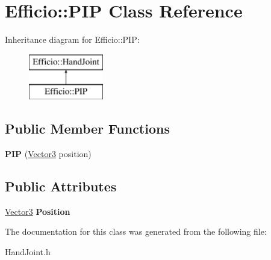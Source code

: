 \hypertarget{class_efficio_1_1_p_i_p}{}\section{Efficio\+:\+:P\+IP Class Reference}
\label{class_efficio_1_1_p_i_p}
Inheritance diagram for Efficio\+:\+:P\+IP\+:\begin{figure}[H]
\begin{center}
\leavevmode
\includegraphics[height=2.000000cm]{class_efficio_1_1_p_i_p}
\end{center}
\end{figure}
\subsection*{Public Member Functions}
\begin{DoxyCompactItemize}
\item 
\hypertarget{class_efficio_1_1_p_i_p_adbeea34fdcf9cd9941853c90d0b8c308}{}\label{class_efficio_1_1_p_i_p_adbeea34fdcf9cd9941853c90d0b8c308} 
{\bfseries P\+IP} (\hyperlink{class_efficio_1_1_vector3}{Vector3} position)
\end{DoxyCompactItemize}
\subsection*{Public Attributes}
\begin{DoxyCompactItemize}
\item 
\hypertarget{class_efficio_1_1_p_i_p_a9744a800843c2efc937c770513ffd36c}{}\label{class_efficio_1_1_p_i_p_a9744a800843c2efc937c770513ffd36c} 
\hyperlink{class_efficio_1_1_vector3}{Vector3} {\bfseries Position}
\end{DoxyCompactItemize}


The documentation for this class was generated from the following file\+:\begin{DoxyCompactItemize}
\item 
Hand\+Joint.\+h\end{DoxyCompactItemize}
